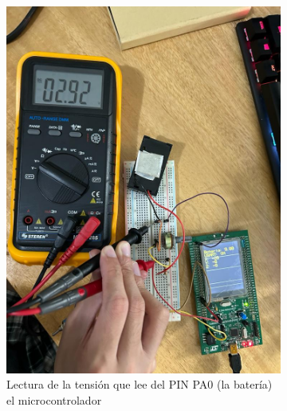 \begin{figure}[H]
    \begin{subfigure}{0.5\textwidth}
    \centering
    \includegraphics[width=\textwidth]{Imagenes/BATERIA.jpg} 
    \caption{Lectura de la tensión que lee del PIN PA0 (la batería) el microcontrolador}
    \label{Fig:BATERIA}
\end{subfigure}
\begin{subfigure}{0.5\textwidth}
    \centering

\end{subfigure}
\end{figure}
